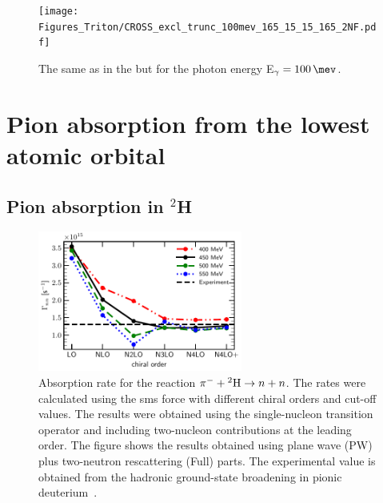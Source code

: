     \begin{figure}[h]
        \begin{center}
            \texttt{[image: Figures\_Triton/CROSS\_excl\_trunc\_100mev\_165\_15\_15\_165\_2NF.pdf]}
            \end{center}
            \caption{The same as in the  but for the photon energy
            E$_\gamma = \SI{100}{\mev}$.}
            \label{CROSS_Triton_EXCL_100mev_165_15_15_165}
    \end{figure}
        
        
    \clearpage
\section{Pion absorption from the lowest atomic orbital}
\label{sec:pion_results}

\subsection{Pion absorption in $^2$H}

    \begin{figure}[h]
        \begin{center}
        \includegraphics[width=0.6\textwidth]{PlotData/PION/Dalitz_maps/figures/Gamma_nn.pdf}
        \end{center}
        \caption{
            Absorption rate for the reaction $\pi^- + {^2{\rm H}} \rightarrow n + n$.
            The rates were calculated using the \gls{sms} force with different chiral orders and cut-off values.
            The results were obtained using the single-nucleon transition operator and 
            including two-nucleon contributions at the leading order.
            The figure shows the results obtained using plane wave (PW) plus
            two-neutron rescattering (Full) parts.
            The experimental value is obtained from the hadronic
            ground-state broadening in pionic deuterium~\cite{Strauch2010,Strauch2011}.}
        \label{Gamma_nn}
    \end{figure}


